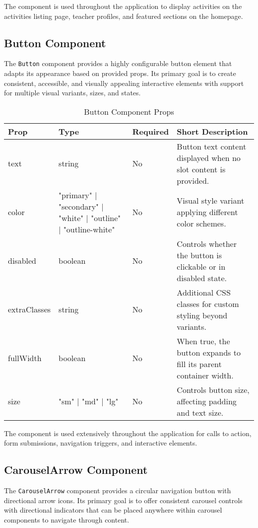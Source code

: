 The component is used throughout the application to display activities on the activities listing page, teacher profiles, and featured sections on the homepage.

\subsection{Button Component}
The \texttt{Button} component provides a highly configurable button element that adapts its appearance based on provided props. Its primary goal is to create consistent, accessible, and visually appealing interactive elements with support for multiple visual variants, sizes, and states.

\begin{table}[H]
    \centering
    \setlength{\tabcolsep}{5pt}
    \renewcommand{\arraystretch}{1.2}
    \begin{tabular}{|p{2.2cm}|p{3.6cm}|p{1.5cm}|p{6cm}|}
        \hline
        \rowcolor{bluepoli!20}
        \textbf{Prop} & \textbf{Type} & \textbf{Required} & \textbf{Short Description} \\
        \hline
        text & string & No & Button text content displayed when no slot content is provided. \\
        \hline
        color & "primary" | "secondary" | "white" | "outline" | "outline-white" & No & Visual style variant applying different color schemes. \\
        \hline
        disabled & boolean & No & Controls whether the button is clickable or in disabled state. \\
        \hline
        extraClasses & string & No & Additional CSS classes for custom styling beyond variants. \\
        \hline
        fullWidth & boolean & No & When true, the button expands to fill its parent container width. \\
        \hline
        size & "sm" | "md" | "lg" & No & Controls button size, affecting padding and text size. \\
        \hline
    \end{tabular}
    \caption{Button Component Props}
\end{table}

The component is used extensively throughout the application for calls to action, form submissions, navigation triggers, and interactive elements.

\subsection{CarouselArrow Component}
The \texttt{CarouselArrow} component provides a circular navigation button with directional arrow icons. Its primary goal is to offer consistent carousel controls with directional indicators that can be placed anywhere within carousel components to navigate through content.

